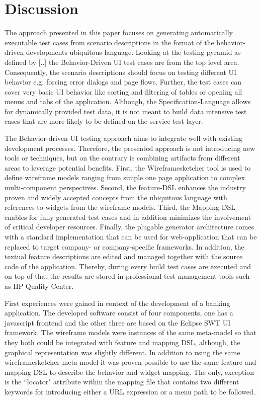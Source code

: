 \documentclass{sig-alternate-05-2015}
\begin{document}
\section{Discussion}\label{sec:Discussion}
The approach presented in this paper focuses on generating automatically executable test cases from scenario descriptions in the format of the behavior-driven developments ubiquitous language.
Looking at the testing pyramid as defined by [..] the Behavior-Driven UI test cases are from the top level area.
Consequently, the scenario descriptions should focus on testing different UI behavior e.g. forcing error dialogs and page flows.
Further, the test cases can cover very basic UI behavior like sorting and filtering of tables or opening all menus and tabs of the application. 
Although, the Specification-Language allows for dynamically provided test data, it is not meant to build data intensive test cases that are more likely to be defined on the service test layer.

The Behavior-driven UI testing approach aims to integrate well with existing development processes. 
Therefore, the presented approach is not introducing new tools or techniques, but on the contrary is combining artifacts from different areas to leverage potential benefits.
First, the Wireframesketcher tool is used to define wireframe models ranging from simple one page application to complex multi-component perspectives.
Second, the feature-DSL enhances the industry proven and widely accepted concepts from the ubiquitous language with references to widgets from the wireframe models.
Third, the Mapping-DSL enables for fully generated test cases and in addition minimizes the involvement of critical developer resources. 
Finally, the plugable generator architecture comes with a standard implementation that can be used for web-application that can be replaced to target company- or company-specific frameworks.
In addition, the textual feature descriptions are edited and managed together with the source code of the application.
Thereby, during every build test cases are executed and on top of that the results are stored in professional test management tools such as HP Quality Center.


First experiences were gained in context of the development of a banking application. 
The developed software consist of four components, one has a javascript frontend and the other three are based on the Eclipse SWT UI framework.
The wireframe models were instances of the same meta-model so that they both could be integrated with feature and mapping DSL, although, the graphical representation was slightly different.
In addition to using the same wireframesketcher meta-model it was proven possible to use the same feature and mapping DSL to describe the behavior and widget mapping.
The only, exception is the ``locator" attribute within the mapping file that contains two different keywords for introducing either a URL expression or a menu path to be followed.
\end{document}
